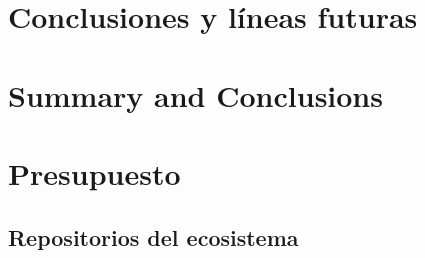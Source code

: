 \documentclass[spanish,a4paper,12pt,oneside]{extreport}
\begin{document}


\newpage{\pagestyle{empty}}
\thispagestyle{empty}

\chapter{\LARGE Conclusiones y líneas futuras}
\label{chapter:Resultados}



\newpage{\pagestyle{empty}}
\thispagestyle{empty}

\chapter{\LARGE Summary and Conclusions}
\label{chapter:Conclusiones}



\newpage{\pagestyle{empty}}
\thispagestyle{empty}

\chapter{\LARGE Presupuesto}
\label{chapter:presupuesto}             



\newpage{\pagestyle{empty}\cleardoublepage}
\thispagestyle{empty}

\begin{appendix}

  \chapter{\LARGE Repositorios del ecosistema}
  \label{appendix:1}
  

\end{appendix}
\printglossary[title=Glosario, toctitle=Glosario]

\glsaddall
\printglossaries
{}
%
%

\printbibliography
{}

%
\end{document}
